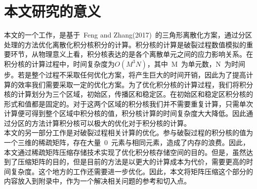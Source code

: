     \section{本文研究的意义}
\indent 本文的一个工作，是基于~Feng and Zhang(2017)~的三角形离散化方案，通过分区处理的方法优化离散化积分核积分的计算。积分核的计算是破裂过程数值模拟的重要环节，从物理意义上看，积分核表达的是各个离散单元之间的应力影响关系。在积分核的计算过程中，时间复杂度为$O(M^{3}N)$，其中~M~为单元数，N~为时间步。若是整个过程不采取任何优化方案，将产生巨大的时间开销，因此为了提高计算的效率我们需要采取一定的优化方案。为了优化积分核的计算过程，我们将积分核的计算划分为三个区域，初始区，传播区和稳定区。在初始区和稳定区积分核的形式和值都是固定的。对于这两个区域的积分核我们并不需要重复计算，只需单次计算便可得到整个区域中积分核的值，积分核计算的时间复杂度大大降低。因此通过分区的方法计算积分核可以极大的优化对于积分核的计算。\\
\indent 本文的另一部分工作是对破裂过程相关计算的优化。参与破裂过程的积分核的值为一个三维的稀疏矩阵，存在大量~0~元素与相同元素，造成了内存的浪费。因此，本文通过稀疏矩阵压缩存储技术实现了优化积分核存储空间的目的。但是，虽然达到了压缩矩阵的目的，但是目前的方法是以更大的计算成本为代价，需要更高的时间复杂度。这个地方的工作还需要进一步优化。因此，本文将矩阵压缩这个部分的内容放入到附录中，作为一个解决相关问题的参考和切入点。
\indent
